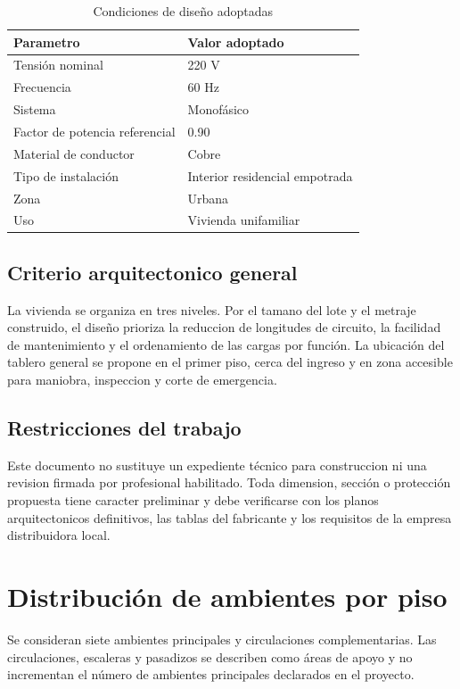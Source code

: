 \begin{table}[H]
\centering
\small
\caption{Condiciones de diseño adoptadas}
\label{tab:condiciones-diseno}
\begin{tabular}{p{6.2cm}p{4cm}}
\toprule
\textbf{Parametro} & \textbf{Valor adoptado} \\
\midrule
Tensión nominal & 220 V \\
Frecuencia & 60 Hz \\
Sistema & Monofásico \\
Factor de potencia referencial & 0.90 \\
Material de conductor & Cobre \\
Tipo de instalación & Interior residencial empotrada \\
Zona & Urbana \\
Uso & Vivienda unifamiliar \\
\bottomrule
\end{tabular}
\end{table}

\subsection{Criterio arquitectonico general}

La vivienda se organiza en tres niveles. Por el tamano del lote y el metraje construido, el diseño prioriza la reduccion de longitudes de circuito, la facilidad de mantenimiento y el ordenamiento de las cargas por función. La ubicación del tablero general se propone en el primer piso, cerca del ingreso y en zona accesible para maniobra, inspeccion y corte de emergencia.

\subsection{Restricciones del trabajo}

Este documento no sustituye un expediente técnico para construccion ni una revision firmada por profesional habilitado. Toda dimension, sección o protección propuesta tiene caracter preliminar y debe verificarse con los planos arquitectonicos definitivos, las tablas del fabricante y los requisitos de la empresa distribuidora local.

\section{Distribución de ambientes por piso}

Se consideran siete ambientes principales y circulaciones complementarias. Las circulaciones, escaleras y pasadizos se describen como áreas de apoyo y no incrementan el número de ambientes principales declarados en el proyecto.

